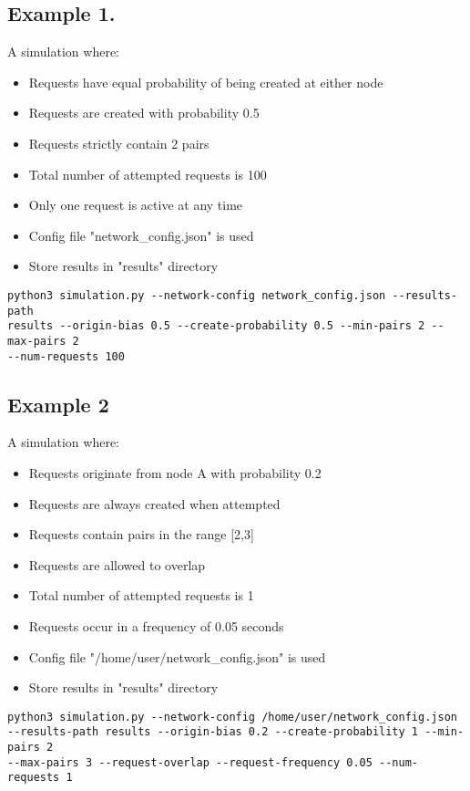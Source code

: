 \documentclass{article}
\begin{document}
\subsection{Example 1.}
A simulation where:
\begin{itemize}
    \item Requests have equal probability of being created at either node
    \item Requests are created with probability 0.5
    \item Requests strictly contain 2 pairs
    \item Total number of attempted requests is 100
    \item Only one request is active at any time
    \item Config file "network\_config.json" is used
    \item Store results in "results" directory
\end{itemize}

\begin{verbatim}
python3 simulation.py --network-config network_config.json --results-path
results --origin-bias 0.5 --create-probability 0.5 --min-pairs 2 --max-pairs 2
--num-requests 100
\end{verbatim}

\subsection{Example 2}
A simulation where:
\begin{itemize}
    \item Requests originate from node A with probability 0.2
    \item Requests are always created when attempted
    \item Requests contain pairs in the range [2,3]
    \item Requests are allowed to overlap
    \item Total number of attempted requests is 1
    \item Requests occur in a frequency of 0.05 seconds
    \item Config file "/home/user/network\_config.json" is used
    \item Store results in "results" directory
\end{itemize}

\begin{verbatim}
python3 simulation.py --network-config /home/user/network_config.json
--results-path results --origin-bias 0.2 --create-probability 1 --min-pairs 2
--max-pairs 3 --request-overlap --request-frequency 0.05 --num-requests 1
\end{verbatim}
\end{document}
